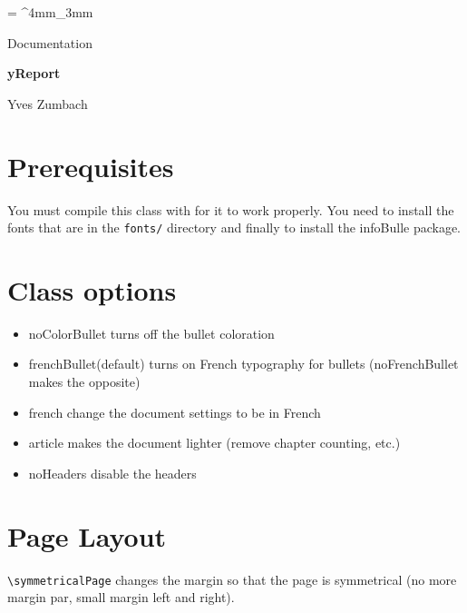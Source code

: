\documentclass[a4paper, 11pt, oneside, fleqn]{article}
\newcommand{\inColor}[1]{{\bfseries\color{mainColor}#1}}
\newcommand{\myTitle}{\inColor{\fontsize{1.3cm}{1em}\selectfont yReport}}
\begin{document}
	\everyrow{\tabucline[.4mm  white]{}}
	\tabulinesep = ^4mm_3mm
	

	\begin{flushleft}
		\begin{minipage}{\widthof{\myTitle}}
			{\fontsize{.6cm}{1em}\selectfont\color{mainColor}
				Documentation
			}
			\begin{spacing}{3}
				\myTitle
			\end{spacing}
			\vspace*{-10mm}
			\begin{flushright}
				Yves Zumbach
			\end{flushright}
		\end{minipage}
	\end{flushleft}
	
	
	\newpage
	{
		\hypersetup{linkcolor=black}
		\tableofcontents
	}
	\newpage
	
	\section{Prerequisites}
	You must compile this class with \XeLaTeX for it to work properly. You need to install the fonts that are in the \lstinline[breaklines]|fonts/| directory and finally to install the infoBulle package.
	
	\section{Class options}
	\begin{itemize}
		\item noColorBullet turns off the bullet coloration
		\item frenchBullet(default) turns on French typography for bullets (noFrenchBullet makes the opposite)
		\item french change the document settings to be in French
		\item article makes the document lighter (remove chapter counting, etc.)
		\item noHeaders disable the headers
	\end{itemize}
	
	\section{Page Layout}
	\lstinline[breaklines]|\symmetricalPage| changes the margin so that the page is symmetrical (no more margin par, small margin left and right).
	
\end{document}

